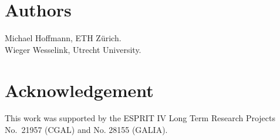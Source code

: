 
\pagestyle{plain}
\setcounter{page}{1}
\newpage


\lcTex{\vspace*{2cm}}

\section*{Authors}

Michael Hoffmann, ETH Z\"urich.\\
Wieger Wesselink, Utrecht University.

\section*{Acknowledgement}

This work was supported
by the ESPRIT IV Long Term Research Projects No.~21957 (CGAL)
and No. 28155 (GALIA).

